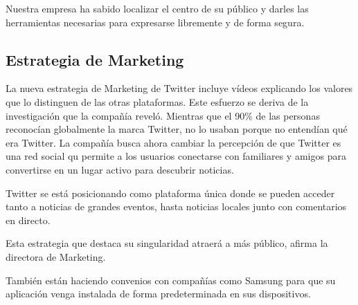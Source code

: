 Nuestra empresa ha sabido localizar el centro de su público y darles las herramientas necesarias para expresarse libremente y de forma segura.

\subsection{Estrategia de Marketing}

La nueva estrategia de Marketing de Twitter incluye vídeos explicando los valores que lo distinguen de las otras plataformas. Este esfuerzo se deriva de la investigación que la compañía reveló. Mientras que el 90\% de las personas reconocían globalmente la marca Twitter, no lo usaban porque no entendían qué era Twitter. La compañía busca ahora cambiar la percepción de que Twitter es una red social qu permite a los usuarios conectarse con familiares y amigos para convertirse en un lugar activo para descubrir noticias.

Twitter se está posicionando como plataforma única donde se pueden acceder tanto a noticias de grandes eventos, hasta noticias locales junto con comentarios en directo.

Esta estrategia que destaca su singularidad atraerá a más público, afirma la directora de Marketing.

También están haciendo convenios con compañías como Samsung para que su aplicación venga instalada de forma predeterminada en sus dispositivos.